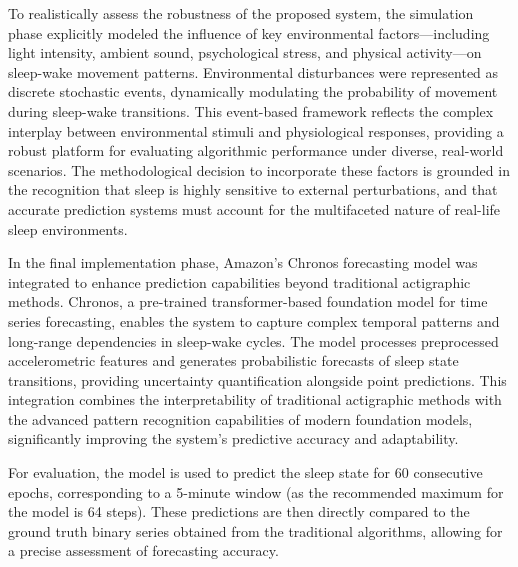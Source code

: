 \documentclass[conference]{IEEEtran}
\begin{document}
To realistically assess the robustness of the proposed system, the simulation phase explicitly modeled the influence of key environmental factors—including light intensity, ambient sound, psychological stress, and physical activity—on sleep-wake movement patterns. Environmental disturbances were represented as discrete stochastic events, dynamically modulating the probability of movement during sleep-wake transitions. This event-based framework reflects the complex interplay between environmental stimuli and physiological responses, providing a robust platform for evaluating algorithmic performance under diverse, real-world scenarios. The methodological decision to incorporate these factors is grounded in the recognition that sleep is highly sensitive to external perturbations, and that accurate prediction systems must account for the multifaceted nature of real-life sleep environments.

In the final implementation phase, Amazon's Chronos forecasting model \cite{ansari2024chronos} was integrated to enhance prediction capabilities beyond traditional actigraphic methods. Chronos, a pre-trained transformer-based foundation model for time series forecasting, enables the system to capture complex temporal patterns and long-range dependencies in sleep-wake cycles. The model processes preprocessed accelerometric features and generates probabilistic forecasts of sleep state transitions, providing uncertainty quantification alongside point predictions. This integration combines the interpretability of traditional actigraphic methods with the advanced pattern recognition capabilities of modern foundation models, significantly improving the system's predictive accuracy and adaptability. 

For evaluation, the model is used to predict the sleep state for 60 consecutive epochs, corresponding to a 5-minute window (as the recommended maximum for the model is 64 steps). These predictions are then directly compared to the ground truth binary series obtained from the traditional algorithms, allowing for a precise assessment of forecasting accuracy.



\end{document}
